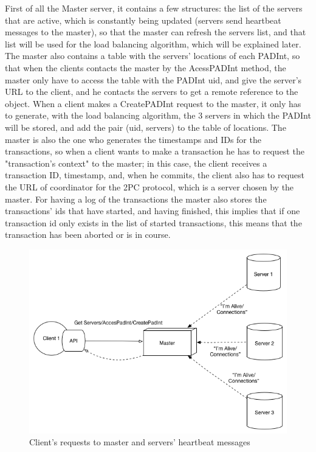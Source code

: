 \documentclass[times, 10pt,twocolumn]{article}
\begin{document}
First of all the Master server, it contains a few structures: the list of the servers that are active, which is constantly being updated (servers send heartbeat messages to the master), so that the master can refresh the servers list, and that list will be used for the load balancing algorithm, which will be explained later. The master also contains a table with the servers' locations of each PADInt, so that when the clients contacts the master by the AcessPADInt method, the master only have to access the table with the PADInt uid, and give the server's URL to the client, and he contacts the servers to get a remote reference to the object. When a client makes a CreatePADInt request to the master, it only has to generate, with the load balancing algorithm, the 3 servers in which the PADInt will be stored, and add the pair (uid, servers) to the table of locations. The master is also the one who generates the timestamps and IDs for the transactions, so when a client wants to make a transaction he has to request the "transaction's context" to the master; in this case, the client receives a transaction ID, timestamp, and, when he commits, the client also has to request the URL of coordinator for the 2PC protocol, which is a server chosen by the master. For having a log of the transactions the master also stores the transactions' ids that have started, and having finished, this implies that if one transaction id only exists in the list of started transactions, this means that the transaction has been aborted or is in course.

\begin{figure}[h!]

\centering

\includegraphics[scale=0.4]{Client-Master.png}

\caption{Client's requests to master and servers' heartbeat messages}

\end{figure}
\end{document}
